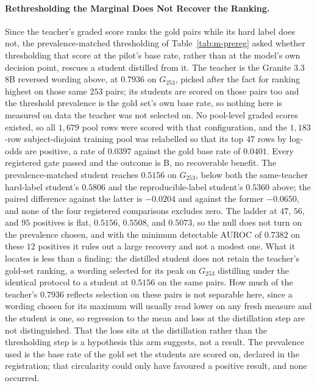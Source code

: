 \paragraph{Rethresholding the Marginal Does Not Recover the Ranking.} Since the
teacher's graded score ranks the gold pairs while its hard label does not, the
prevalence-matched thresholding of Table~\ref{tab:m-prereg} asked whether
thresholding that score at the pilot's base rate, rather than at the model's own
decision point, rescues a student distilled from it. The teacher is the Granite
3.3 8B reversed wording above, at $0.7936$ on $G_{253}$, picked after the fact for
ranking highest on those same $253$ pairs; its students are scored on those pairs
too and the threshold prevalence is the gold set's own base rate, so nothing here
is measured on data the teacher was not selected on. No pool-level graded
scores existed, so all $1{,}679$ pool rows were scored with that configuration,
and the $1{,}183$-row subject-disjoint training pool was relabelled so that its
top $47$ rows by log-odds are positive, a rate of $0.0397$ against the gold base
rate of $0.0401$.
Every registered gate passed and the outcome is B, no recoverable benefit. The
prevalence-matched student reaches $0.5156$ on $G_{253}$, below both the
same-teacher hard-label student's $0.5806$ and the reproducible-label student's
$0.5360$ above; the paired difference against the latter is $-0.0204$ and against
the former $-0.0650$, and none of the four registered comparisons excludes zero.
The ladder at $47$, $56$, and $95$ positives is flat, $0.5156$, $0.5508$, and
$0.5073$, so the null does not turn on the prevalence chosen, and with the
minimum detectable AUROC of $0.7382$ on these $12$ positives it rules out a large
recovery and not a modest one. What it locates is less than a finding: the
distilled student does not retain the teacher's gold-set ranking, a wording
selected for its peak on $G_{253}$ distilling under the identical protocol to a
student at $0.5156$ on the same pairs. How much of the teacher's $0.7936$ reflects
selection on these pairs is not separable here, since a wording chosen for its
maximum will usually read lower on any fresh measure and the student is one, so
regression to the mean and loss at the distillation step are not distinguished.
That the loss sits at the distillation rather than the thresholding step is a
hypothesis this arm suggests, not a result. The prevalence used is the base rate of the gold
set the students are scored on, declared in the registration; that circularity
could only have favoured a positive result, and none occurred.

